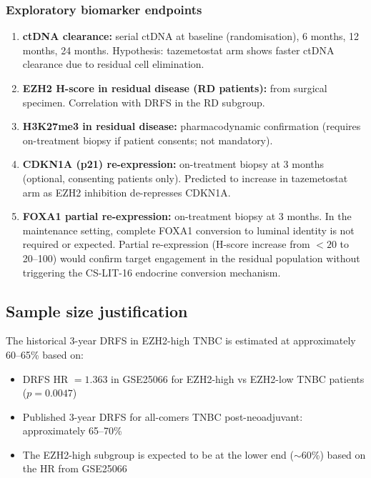 \documentclass[12pt, a4paper]{article}
\begin{document}
\subsubsection{Exploratory biomarker endpoints}

\begin{enumerate}
  \item \textbf{ctDNA clearance:} serial ctDNA
        at baseline (randomisation), 6 months,
        12 months, 24 months. Hypothesis:
        tazemetostat arm shows faster ctDNA
        clearance due to residual cell
        elimination.

  \item \textbf{EZH2 H-score in residual disease
        (RD patients):} from surgical specimen.
        Correlation with DRFS in the RD subgroup.

  \item \textbf{H3K27me3 in residual disease:}
        pharmacodynamic confirmation (requires
        on-treatment biopsy if patient consents;
        not mandatory).

  \item \textbf{CDKN1A (p21) re-expression:}
        on-treatment biopsy at 3 months (optional,
        consenting patients only). Predicted to
        increase in tazemetostat arm as EZH2
        inhibition de-represses CDKN1A.

  \item \textbf{FOXA1 partial re-expression:}
        on-treatment biopsy at 3 months.
        In the maintenance setting, complete FOXA1
        conversion to luminal identity is not
        required or expected. Partial re-expression
        (H-score increase from $<20$ to 20--100)
        would confirm target engagement in the
        residual population without triggering
        the CS-LIT-16 endocrine conversion
        mechanism.
\end{enumerate}

\subsection{Sample size justification}

The historical 3-year DRFS in EZH2-high TNBC is
estimated at approximately 60--65\% based on:

\begin{itemize}[noitemsep]
  \item DRFS HR $= 1.363$ in GSE25066 for EZH2-high
        vs EZH2-low TNBC patients ($p = 0.0047$)
  \item Published 3-year DRFS for all-comers TNBC
        post-neoadjuvant: approximately 65--70\%
  \item The EZH2-high subgroup is expected to be
        at the lower end ($\sim$60\%) based on
        the HR from GSE25066
\end{itemize}
\end{document}
